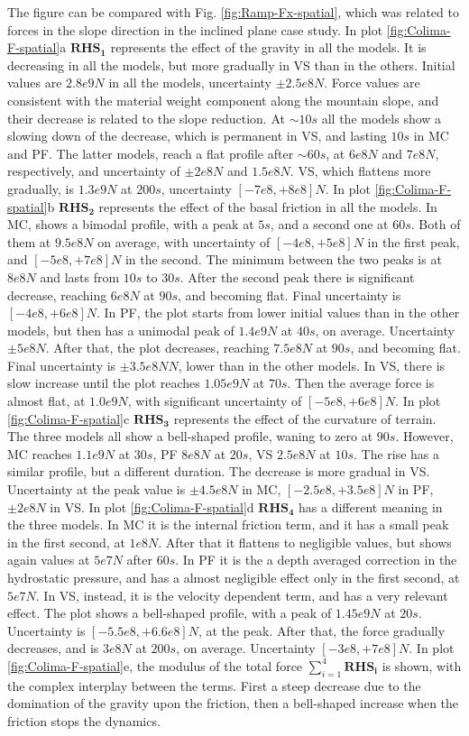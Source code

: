 \documentclass{article}
\begin{document}
The figure can be compared with Fig. \ref{fig:Ramp-Fx-spatial}, which was related to forces in the slope direction in the inclined plane case study. In plot \ref{fig:Colima-F-spatial}a $\boldsymbol{RHS_1}$ represents the effect of the gravity in all the models. It is decreasing in all the models, but more gradually in VS than in the others. Initial values are $2.8e9 N$ in all the models, uncertainty $\pm 2.5e8 N$. Force values are consistent with the material weight component along the mountain slope, and their decrease is related to the slope reduction. At $\sim 10 s$ all the models show a slowing down of the decrease, which is permanent in VS, and lasting $10 s$ in MC and PF. The latter models, reach a flat profile after $\sim 60 s$, at $6e8 N$ and $7e8 N$, respectively, and uncertainty of $\pm 2e8 N$ and $1.5e8 N$. VS, which flattens more gradually, is $1.3e9 N$ at $200 s$, uncertainty $[-7e8,+8e8] N$. In plot  \ref{fig:Colima-F-spatial}b $\boldsymbol{RHS_2}$ represents the effect of the basal friction in all the models. In MC, shows a bimodal profile, with a peak at $5 s$, and a second one at $60 s$. Both of them at $9.5e8 N$ on average, with uncertainty of $[-4e8,+5e8] N$ in the first peak, and $[-5e8,+7e8] N$ in the second. The minimum between the two peaks is at $8e8 N$ and lasts from $10 s$ to $30 s$. After the second peak there is significant decrease, reaching $6e8 N$ at $90 s$, and becoming flat. Final uncertainty is $[-4e8, +6e8] N$. In PF, the plot starts from lower initial values than in the other models, but then has a unimodal peak of $1.4e9 N$ at $40 s$, on average. Uncertainty $\pm 5e8 N$. After that, the plot decreases, reaching $7.5e8 N$ at $90 s$, and becoming flat. Final uncertainty is $\pm 3.5e8 N N$, lower than in the other models. In VS, there is slow increase until the plot reaches $1.05e9 N$ at $70 s$. Then the average force is almost flat, at $1.0e9 N$, with significant uncertainty of $[-5e8,+6e8] N$. In plot \ref{fig:Colima-F-spatial}c $\boldsymbol{RHS_3}$ represents the effect of the curvature of terrain. The three models all show a bell-shaped profile, waning to zero at $90 s$. However, MC reaches $1.1e9 N$ at $30 s$, PF $8e8 N$ at $20 s$, VS $2.5e8 N$ at $10 s$. The rise has a similar profile, but a different duration. The decrease is more gradual in VS. Uncertainty at the peak value is $\pm 4.5e8 N$ in MC, $[-2.5e8,+3.5e8] N$ in PF, $\pm 2e8 N$ in VS. In plot \ref{fig:Colima-F-spatial}d $\boldsymbol{RHS_4}$ has a different meaning in the three models. In MC it is the internal friction term, and it has a small peak in the first second, at $1e8 N$. After that it flattens to negligible values, but shows again values at $5e7 N$ after $60 s$. In PF it is the a depth averaged correction in the hydrostatic pressure, and has a almost negligible effect only in the first second, at $5e7 N$. In VS, instead, it is the velocity dependent term, and has a very relevant effect. The plot shows a bell-shaped profile, with a peak of $1.45e9 N$ at $20 s$. Uncertainty is $[-5.5e8, +6.6e8] N$, at the peak. After that, the force gradually decreases, and is $3e8 N$ at $200 s$, on average. Uncertainty $[-3e8, +7e8] N$. In plot \ref{fig:Colima-F-spatial}e, the modulus of the total force $\sum^4_{i=1}\boldsymbol{RHS_i}$ is shown, with the complex interplay between the terms. First a steep decrease due to the domination of the gravity upon the friction, then a bell-shaped increase when the friction stops the dynamics.
\end{document}
